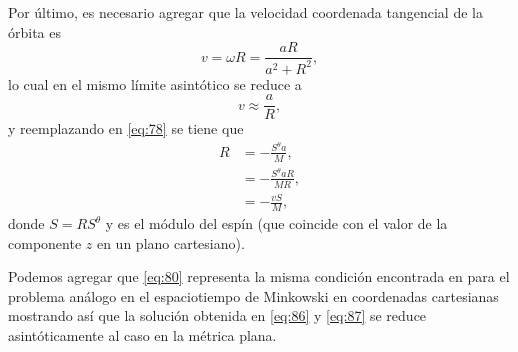 Por último, es necesario agregar que la velocidad coordenada tangencial de la órbita es
\begin{equation}
v = \omega R = \frac{aR}{a^2 + R^2},
\end{equation}
lo cual en el mismo límite asintótico se reduce a
\begin{equation}
\label{eq:79}
v \approx \frac{a}{R},
\end{equation}
y reemplazando en \eqref{eq:78} se tiene que
\begin{align}
\nonumber
R &= -\frac{S^{\theta}a}{M},\\
\nonumber
&= -\frac{S^{\theta}aR}{MR},\\
\label{eq:80}
&= -\frac{vS}{M},
\end{align}
donde $S = R S^{\theta}$ y es el módulo del espín (que coincide con el valor de la componente $z$ en un plano cartesiano).

Podemos agregar que \eqref{eq:80} representa la misma condición encontrada en \cite{Costa-Herdeiro-Natario-Zilhao} para el problema análogo en el espaciotiempo de Minkowski en coordenadas cartesianas mostrando así que la solución obtenida en \eqref{eq:86} y \eqref{eq:87} se reduce asintóticamente al caso en la métrica plana.